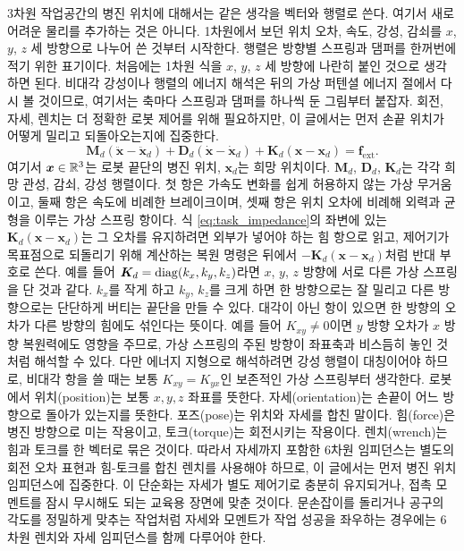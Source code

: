 3차원 작업공간의 병진 위치에 대해서는 같은 생각을 벡터와 행렬로 쓴다.
여기서 새로 어려운 물리를 추가하는 것은 아니다.
1차원에서 보던 위치 오차, 속도, 강성, 감쇠를 $x$, $y$, $z$ 세 방향으로 나누어 쓴 것부터 시작한다.
행렬은 방향별 스프링과 댐퍼를 한꺼번에 적기 위한 표기이다.
처음에는 1차원 식을 $x$, $y$, $z$ 세 방향에 나란히 붙인 것으로 생각하면 된다.
비대각 강성이나 행렬의 에너지 해석은 뒤의 가상 퍼텐셜 에너지 절에서 다시 볼 것이므로, 여기서는 축마다 스프링과 댐퍼를 하나씩 둔 그림부터 붙잡자.
회전, 자세, 렌치는 더 정확한 로봇 제어를 위해 필요하지만, 이 글에서는 먼저 손끝 위치가 어떻게 밀리고 되돌아오는지에 집중한다.
\begin{equation}
  \bm{M}_d(\ddot{\bm{x}} - \ddot{\bm{x}}_d)
  +
  \bm{D}_d(\dot{\bm{x}} - \dot{\bm{x}}_d)
  +
  \bm{K}_d(\bm{x} - \bm{x}_d)
  =
  \bm{f}_{\mathrm{ext}}.
  \label{eq:task_impedance}
\end{equation}
여기서 $\bm{x}\in\mathbb{R}^3$는 로봇 끝단의 병진 위치, $\bm{x}_d$는 희망 위치이다.
$\bm{M}_d$, $\bm{D}_d$, $\bm{K}_d$는 각각 희망 관성, 감쇠, 강성 행렬이다.
첫 항은 가속도 변화를 쉽게 허용하지 않는 가상 무거움이고, 둘째 항은 속도에 비례한 브레이크이며, 셋째 항은 위치 오차에 비례해 외력과 균형을 이루는 가상 스프링 항이다.
식 \eqref{eq:task_impedance}의 좌변에 있는 $\bm{K}_d(\bm{x}-\bm{x}_d)$는 그 오차를 유지하려면 외부가 넣어야 하는 힘 항으로 읽고, 제어기가 목표점으로 되돌리기 위해 계산하는 복원 명령은 뒤에서 $-\bm{K}_d(\bm{x}-\bm{x}_d)$처럼 반대 부호로 쓴다.
예를 들어 $\bm{K}_d=\mathrm{diag}(k_x,k_y,k_z)$라면 $x$, $y$, $z$ 방향에 서로 다른 가상 스프링을 단 것과 같다.
$k_x$를 작게 하고 $k_y$, $k_z$를 크게 하면 한 방향으로는 잘 밀리고 다른 방향으로는 단단하게 버티는 끝단을 만들 수 있다.
대각이 아닌 항이 있으면 한 방향의 오차가 다른 방향의 힘에도 섞인다는 뜻이다.
예를 들어 $K_{xy}\neq0$이면 $y$ 방향 오차가 $x$ 방향 복원력에도 영향을 주므로, 가상 스프링의 주된 방향이 좌표축과 비스듬히 놓인 것처럼 해석할 수 있다.
다만 에너지 지형으로 해석하려면 강성 행렬이 대칭이어야 하므로, 비대각 항을 쓸 때는 보통 $K_{xy}=K_{yx}$인 보존적인 가상 스프링부터 생각한다.
로봇에서 위치(position)는 보통 $x,y,z$ 좌표를 뜻한다.
자세(orientation)는 손끝이 어느 방향으로 돌아가 있는지를 뜻한다.
포즈(pose)는 위치와 자세를 합친 말이다.
힘(force)은 병진 방향으로 미는 작용이고, 토크(torque)는 회전시키는 작용이다.
렌치(wrench)는 힘과 토크를 한 벡터로 묶은 것이다.
따라서 자세까지 포함한 6차원 임피던스는 별도의 회전 오차 표현과 힘-토크를 합친 렌치를 사용해야 하므로, 이 글에서는 먼저 병진 위치 임피던스에 집중한다.
%
이 단순화는 자세가 별도 제어기로 충분히 유지되거나, 접촉 모멘트를 잠시 무시해도 되는 교육용 장면에 맞춘 것이다.
문손잡이를 돌리거나 공구의 각도를 정밀하게 맞추는 작업처럼 자세와 모멘트가 작업 성공을 좌우하는 경우에는 6차원 렌치와 자세 임피던스를 함께 다루어야 한다.

